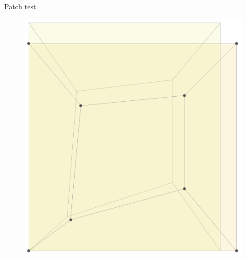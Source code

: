 \documentclass[aspectratio=169,xcolor=dvipsnames]{beamer}
\begin{document}
\begin{frame}{Patch test}
 	\begin{figure}
 	\begin{minipage}[c]{0.2\linewidth}
\includegraphics[width=0.9\linewidth]{patch_def.png}
 	\end{minipage}\hfill
 	\begin{minipage}[c]{0.8\linewidth}
 		\begin{minipage}{0.32\linewidth}
 			    \fontsize{3pt}{4pt}\selectfont{
 			\def\svgwidth{\linewidth}
 			}
 		\end{minipage}\hfill
 		\begin{minipage}{0.32\linewidth}
 		    \fontsize{3pt}{4pt}\selectfont{
 			\def\svgwidth{\linewidth}
 			}
 	\end{minipage}\hfill	\begin{minipage}{0.32\linewidth}
 	    \fontsize{3pt}{4pt}\selectfont{
 		\def\svgwidth{\linewidth}
 		}
 \end{minipage}\hfill
 	\end{minipage}\hfill
\end{figure}
\begin{figure}
 \begin{minipage}{\linewidth}
  	\begin{minipage}[c]{0.3\linewidth}

\end{minipage}
\end{minipage}
\end{figure}
\end{frame}
\end{document}
